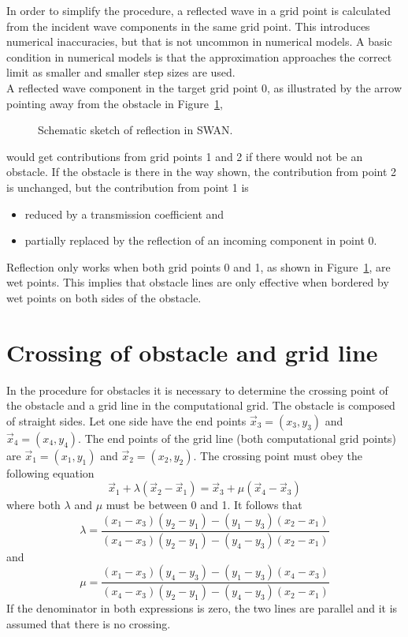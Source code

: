 \documentclass[12pt]{book}
\begin{document}
In order to simplify the procedure, a reflected wave in a grid point is calculated
from the incident wave components in the same grid point.
This introduces numerical inaccuracies, but that is not uncommon in numerical models.
A basic condition in numerical models is that the approximation approaches the correct limit
as smaller and smaller step sizes are used.
\\[2ex]
\noindent
A reflected wave component in the target grid point 0, as illustrated by the arrow pointing
away from the obstacle in Figure~\ref{fig:stencil2},
\begin{figure}[htb]
   \centerline{
              }
      \caption{Schematic sketch of reflection in SWAN.}
      \label{fig:stencil2}
\end{figure}
would get contributions from grid points 1 and 2 if there would not be an obstacle.
If the obstacle is there in the way shown, the contribution from point 2 is unchanged,
but the contribution from point 1 is
\begin{itemize}
  \item reduced by a transmission coefficient and
  \item partially replaced by the reflection of an incoming component in point 0.
\end{itemize}
Reflection only works when both grid points 0 and 1, as shown in Figure~\ref{fig:stencil2}, are wet points. This implies
that obstacle lines are only effective when bordered by wet points on both sides of the obstacle.

\section{Crossing of obstacle and grid line}
\label{sec:cross}

In the procedure for obstacles it is necessary to determine the crossing point of the obstacle and a grid line in the computational grid.
The obstacle is composed of straight sides. Let one side have the end points $\vec{x}_3 = (x_3,y_3)$ and $\vec{x}_4 = (x_4,y_4)$.
The end points of the grid line (both computational grid points) are
$\vec{x}_1=(x_1,y_1)$ and $\vec{x}_2 = (x_2,y_2)$. The crossing point must obey the following equation
\begin{equation}
  \vec{x}_1 + \lambda (\vec{x}_2-\vec{x}_1) = \vec{x}_3 + \mu(\vec{x}_4-\vec{x}_3)
\end{equation}
where both $\lambda$ and $\mu$ must be between 0 and 1. It follows that
\begin{equation}
  \lambda = \frac{(x_1-x_3)(y_2-y_1) - (y_1-y_3)(x_2-x_1)}
                 {(x_4-x_3)(y_2-y_1) - (y_4-y_3)(x_2-x_1)}
\end{equation}
and
\begin{equation}
  \mu = \frac{(x_1-x_3)(y_4-y_3) - (y_1-y_3)(x_4-x_3)}
             {(x_4-x_3)(y_2-y_1) - (y_4-y_3)(x_2-x_1)}
\end{equation}
If the denominator in both expressions is zero, the two lines are parallel and it is assumed that there is no crossing.
\end{document}
